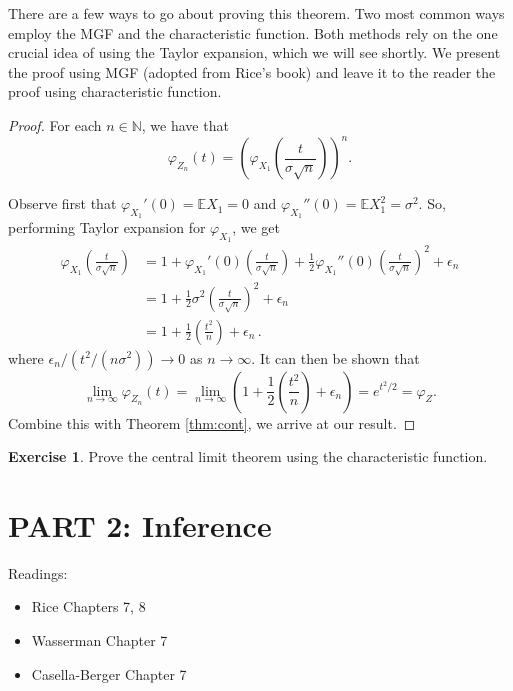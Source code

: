 \documentclass[
  openany]{book}
\providecommand{\tightlist}{%
  \setlength{\itemsep}{0pt}\setlength{\parskip}{0pt}}
\theoremstyle{definition}
\theoremstyle{definition}
\theoremstyle{definition}
\newtheorem{exercise}{Exercise}[chapter]
\theoremstyle{definition}
\theoremstyle{remark}
\begin{document}
There are a few ways to go about proving this theorem.
Two most common ways employ the MGF and the characteristic function.
Both methods rely on the one crucial idea of using the Taylor expansion,
which we will see shortly.
We present the proof using MGF (adopted from Rice's book) and leave it to the reader the proof using characteristic function.

\begin{proof}
For each \(n \in \mathbb{N}\), we have that
\[ \varphi_{Z_n} (t) = \left( \varphi_{X_1} \left( \frac{t}{\sigma \sqrt{n}} \right) \right)^n. \]

Observe first that
\(\varphi_{X_1}'(0) = \mathbb{E}X_1 = 0\) and \(\varphi_{X_1}''(0) = \mathbb{E}X_1^2 = \sigma^2\).
So, performing Taylor expansion for \(\varphi_{X_1}\), we get
\[
\begin{aligned}
\varphi_{X_1} \left( \frac{t}{\sigma \sqrt{n}} \right)  
        &=  1 + \varphi_{X_1}'(0) \left( \frac{t}{\sigma \sqrt{n}} \right) 
           + \frac{1}{2} \varphi_{X_1}''(0) \left( \frac{t}{\sigma \sqrt{n}} \right)^2 + \epsilon_n  \\
        & = 1 + \frac{1}{2} \sigma^2 \left( \frac{t}{\sigma \sqrt{n}} \right)^2 + \epsilon_n \\
        & = 1 + \frac{1}{2} \left( \frac{t^2}{n} \right) + \epsilon_n \,.
\end{aligned}\]
where \(\epsilon_n / (t^2 / (n\sigma^2)) \to 0\) as \(n \to \infty\).
It can then be shown that
\[ \lim_{n\to \infty} \varphi_{Z_n}(t) = \lim_{n\to \infty} \left( 1 + \frac{1}{2} \left( \frac{t^2}{n} \right) + \epsilon_n  \right) = e^{t^2/2} = \varphi_Z .\]
Combine this with Theorem \ref{thm:cont}, we arrive at our result.
\end{proof}

\begin{exercise}
Prove the central limit theorem using the characteristic function.
\end{exercise}

\chapter*{PART 2: Inference}\label{part-2-inference}


Readings:

\begin{itemize}
\tightlist
\item
  Rice Chapters 7, 8
\item
  Wasserman Chapter 7
\item
  Casella-Berger Chapter 7
\end{itemize}
\end{document}
